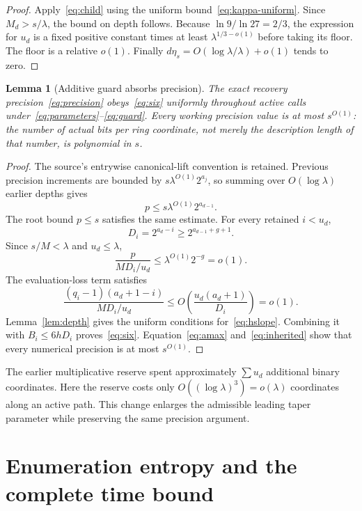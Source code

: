 \documentclass[11pt,letterpaper]{article}
\numberwithin{equation}{section}
\newtheorem{lemma}[theorem]{Lemma}
\theoremstyle{definition}\newtheorem{definition}[theorem]{Definition}
\theoremstyle{remark}\newtheorem{remark}[theorem]{Remark}
\begin{document}
\begin{proof}
Apply~\eqref{eq:child} using the uniform bound~\eqref{eq:kappa-uniform}. Since $M_d>s/\lambda$, the bound on depth follows. Because $\ln9/\ln27=2/3$, the expression for $u_d$ is a fixed positive constant times at least $\lambda^{1/3-o(1)}$ before taking its floor. The floor is a relative $o(1)$. Finally $d\eta_s=O(\log\lambda/\lambda)+o(1)$ tends to zero.
\end{proof}

\begin{lemma}[Additive guard absorbs precision]\label{lem:precisionguard}
The exact recovery precision~\eqref{eq:precision} obeys~\eqref{eq:six} uniformly throughout active calls under~\eqref{eq:parameters}--\eqref{eq:guard}. Every working precision value is at most $s^{O(1)}$: the number of actual bits per ring coordinate, not merely the description length of that number, is polynomial in $s$.
\end{lemma}

\begin{proof}
The source's entrywise canonical-lift convention is retained. Previous precision increments are bounded by $s\lambda^{O(1)}2^{a_j}$, so summing over $O(\log\lambda)$ earlier depths gives
\begin{equation}\label{eq:inherited}
 p\le s\lambda^{O(1)}2^{a_{d-1}}.
\end{equation}
The root bound $p\le s$ satisfies the same estimate. For every retained $i<u_d$,
\[
 D_i=2^{a_d-i}\ge2^{a_{d-1}+g+1}.
\]
Since $s/M<\lambda$ and $u_d\le\lambda$,
\[
 \frac{p}{MD_i/u_d}\le\lambda^{O(1)}2^{-g}=o(1).
\]
The evaluation-loss term satisfies
\[
 \frac{(q_i-1)(a_d+1-i)}{MD_i/u_d}
 \le O\!\left(\frac{u_d(a_d+1)}{D_i}\right)=o(1).
\]
Lemma~\ref{lem:depth} gives the uniform conditions for~\eqref{eq:hslope}. Combining it with $B_i\le6hD_i$ proves~\eqref{eq:six}. Equation~\eqref{eq:amax} and~\eqref{eq:inherited} show that every numerical precision is at most $s^{O(1)}$.
\end{proof}

The earlier multiplicative reserve spent approximately $\sum u_d$ additional binary coordinates. Here the reserve costs only $O((\log\lambda)^3)=o(\lambda)$ coordinates along an active path. This change enlarges the admissible leading taper parameter while preserving the same precision argument.

\section{Enumeration entropy and the complete time bound}
\label{sec:cost}
\end{document}
